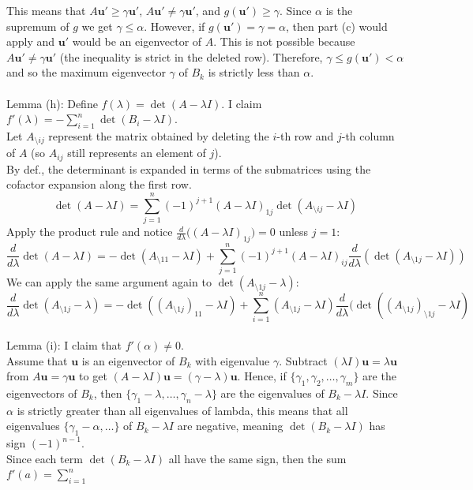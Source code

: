 \documentclass[14pt,letterpaper]{extarticle}
\newcommand*{\bu}{\mathbf{u}}
\begin{document}
This means that $A\bu'\ge \gamma\bu'$, $A\bu'\ne \gamma\bu'$, and $g(\bu')\ge \gamma$.
Since $\alpha$ is the supremum of $g$ we get $\gamma \le \alpha$.
However, if $g(\bu')=\gamma=\alpha$, then part (c) would apply and $\bu'$ would be an eigenvector of $A$.
This is not possible because $A\bu' \ne \gamma\bu'$ (the inequality is strict in the deleted row).
Therefore, $\gamma \le g(\bu')<\alpha$ and so the maximum eigenvector $\gamma$ of $B_k$ is strictly less than $\alpha$. \\
\vspace{2mm} \\
Lemma (h): Define $f(\lambda)=\det(A-\lambda I)$. I claim  $f'(\lambda)=-\sum_{i=1}^n \det(B_i-\lambda I)$. \\
Let $A_{\setminus ij}$ represent the matrix obtained by deleting the $i$-th row and $j$-th column of $A$ (so $A_{ij}$ still represents an element of $j$). \\
By def., the determinant is expanded in terms of the submatrices using the cofactor expansion along the first row. 
\[ \det (A-\lambda I)=\sum_{j=1}^n (-1)^{j+1}(A-\lambda I)_{1j}\det (A_{\setminus ij}-\lambda I) \]
Apply the product rule and notice $\frac{d}{d\lambda}\big((A-\lambda I)_{1j}\big)=0$ unless $j=1$:
\[ \frac{d}{d\lambda}\det(A-\lambda I)=-\det(A_{\setminus 11} -\lambda I)+\sum_{j=1}^n(-1)^{j+1}(A-\lambda I)_{ij}\frac{d}{d\lambda}(\det(A_{\setminus 1j}-\lambda I)) \]
We can apply the same argument again to $\det(A_{\setminus 1j}-\lambda)$: 
\[ \frac{d}{d\lambda}\det(A_{\setminus 1j}-\lambda)=-\det((A_{\setminus 1j})_{11}-\lambda I)+\sum_{i=1}^n (A_{\setminus {1j}}-\lambda I)\frac{d}{d\lambda}(\det((A_{\setminus 1j})_{\setminus 1j}-\lambda I) \]
\vspace{2mm} \\
Lemma (i): I claim that $f'(\alpha)\ne 0$. \\
Assume that $\bu$ is an eigenvector of $B_k$ with eigenvalue $\gamma$.
Subtract $(\lambda I)\bu =\lambda \bu $ from $A\bu=\gamma \bu$ to get $(A-\lambda I)\bu=(\gamma - \lambda)\bu$.
Hence, if $\{\gamma_1,\gamma_2,\dots,\gamma_m\}$ are  the eigenvectors of $B_k$, then $\{\gamma_1-\lambda,\dots,\gamma_n-\lambda\}$ are the eigenvalues of $B_k-\lambda I$. 
Since $\alpha$ is strictly greater than all eigenvalues of lambda, this means that all eigenvalues $\{\gamma_1-\alpha,\dots\}$ of $B_k-\lambda I$ are negative, meaning $\det(B_k-\lambda I)$ has sign $(-1)^{n-1}$.  \\
Since each term $\det (B_k-\lambda I)$ all have the same sign, then the sum $f'(a)=\sum_{i=1}^n$
\end{document}
